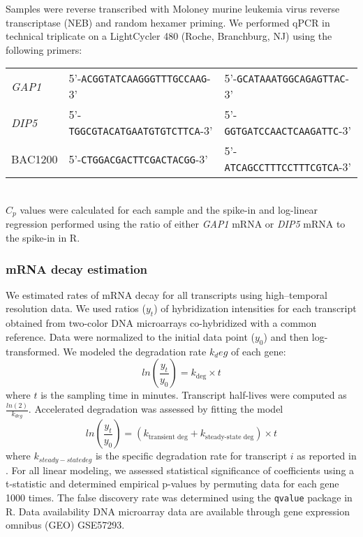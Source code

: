Samples were reverse
transcribed with Moloney murine leukemia virus reverse transcriptase
(NEB) and random hexamer priming. We performed qPCR in technical
triplicate on a LightCycler 480 (Roche, Branchburg, NJ) using the
following primers: \\[1em]
\begin{tabular}{l | p{15em} p{15em}}
  \textit{GAP1} & 5'-\texttt{ACGGTATCAAGGGTTTGCCAAG}-3' &
    5'-\texttt{GCATAAATGGCAGAGTTAC}-3' \\
  \textit{DIP5} & 5'-\texttt{TGGCGTACATGAATGTGTCTTCA}-3' &
    5'-\texttt{GGTGATCCAACTCAAGATTC}-3' \\
  BAC1200 & 5'-\texttt{CTGGACGACTTCGACTACGG}-3' & 
    5'-\texttt{ATCAGCCTTTCCTTTCGTCA}-3' \\
\end{tabular} \\[1em]
$C_p$ values
were calculated for each sample and the spike-in and log-linear
regression performed using the ratio of either \textit{GAP1} mRNA or \textit{DIP5} mRNA
to the spike-in in R.  

\subsubsection{mRNA decay estimation}

We estimated rates of
mRNA decay for all transcripts using high–temporal resolution data. We
used ratios ($y_t$) of hybridization intensities for each transcript
obtained from two-color DNA microarrays co-hybridized with a common
reference. Data were normalized to the initial data point ($y_0$) and
then log-transformed. We modeled the degradation rate $k_deg$ of each
gene:
$$ ln\left(\frac{y_t}{y_0}\right)=k_{\text{deg}}\times t$$
where $t$ is the sampling time in minutes. Transcript
half-lives were computed as $\frac{ln(2)}{k_{deg}}$. 
Accelerated degradation was
assessed by fitting the model 
$$ ln\left(\frac{y_t}{y_0}\right)=(k_{\text{transient
deg}}+k_{\text{steady-state deg}})\times t$$
where $k_{steady-state deg}$ 
is the specific degradation rate for transcript $i$ as reported in 
\cite{neymotin2014determination}.
For all linear modeling, we assessed statistical
significance of coefficients using a t-statistic and determined
empirical p-values by permuting data for each gene 1000 times. The
false discovery rate was determined using the \texttt{qvalue} package in R.
Data availability DNA microarray data are available through gene
expression omnibus (GEO) GSE57293.

